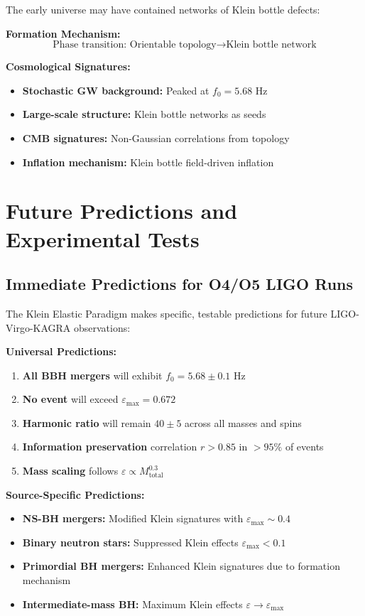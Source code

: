 \documentclass[12pt,a4paper]{article}
\newcommand{\epsilonmax}{\varepsilon_{\text{max}}}
\newcommand{\fzero}{f_0}
\begin{document}
The early universe may have contained networks of Klein bottle defects:

\textbf{Formation Mechanism:}
\begin{equation}
\text{Phase transition: } \text{Orientable topology} \rightarrow \text{Klein bottle network}
\end{equation}

\textbf{Cosmological Signatures:}
\begin{itemize}
    \item \textbf{Stochastic GW background:} Peaked at $\fzero = 5.68$ Hz
    \item \textbf{Large-scale structure:} Klein bottle networks as seeds
    \item \textbf{CMB signatures:} Non-Gaussian correlations from topology
    \item \textbf{Inflation mechanism:} Klein bottle field-driven inflation
\end{itemize}

\section{Future Predictions and Experimental Tests}

\subsection{Immediate Predictions for O4/O5 LIGO Runs}

The Klein Elastic Paradigm makes specific, testable predictions for future LIGO-Virgo-KAGRA observations:

\textbf{Universal Predictions:}
\begin{enumerate}
    \item \textbf{All BBH mergers} will exhibit $\fzero = 5.68 \pm 0.1$ Hz
    \item \textbf{No event} will exceed $\epsilonmax = 0.672$
    \item \textbf{Harmonic ratio} will remain $40 \pm 5$ across all masses and spins
    \item \textbf{Information preservation} correlation $r > 0.85$ in $>95\%$ of events
    \item \textbf{Mass scaling} follows $\varepsilon \propto M_{\text{total}}^{0.3}$
\end{enumerate}

\textbf{Source-Specific Predictions:}
\begin{itemize}
    \item \textbf{NS-BH mergers:} Modified Klein signatures with $\varepsilon_{\max} \sim 0.4$
    \item \textbf{Binary neutron stars:} Suppressed Klein effects $\varepsilon_{\max} < 0.1$
    \item \textbf{Primordial BH mergers:} Enhanced Klein signatures due to formation mechanism
    \item \textbf{Intermediate-mass BH:} Maximum Klein effects $\varepsilon \rightarrow \epsilonmax$
\end{itemize}
\end{document}
